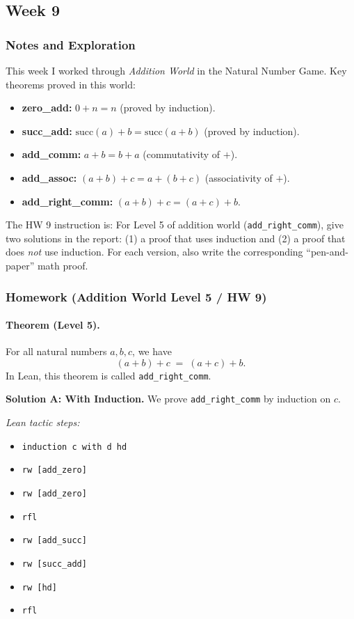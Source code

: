 \documentclass[11pt]{article}
\begin{document}
\subsection{Week 9}

\subsubsection{Notes and Exploration}
This week I worked through \emph{Addition World} in the Natural Number Game.  
Key theorems proved in this world:
\begin{itemize}[leftmargin=1.4em]
  \item \textbf{zero\_add:} $0 + n = n$ (proved by induction).
  \item \textbf{succ\_add:} $\mathrm{succ}(a) + b = \mathrm{succ}(a + b)$ (proved by induction).
  \item \textbf{add\_comm:} $a + b = b + a$ (commutativity of $+$).
  \item \textbf{add\_assoc:} $(a + b) + c = a + (b + c)$ (associativity of $+$).
  \item \textbf{add\_right\_comm:} $(a + b) + c = (a + c) + b$.
\end{itemize}

The HW 9 instruction is:  
For Level 5 of addition world (\texttt{add\_right\_comm}), give two solutions in the report:
(1) a proof that uses induction and  
(2) a proof that does \emph{not} use induction.  
For each version, also write the corresponding ``pen-and-paper'' math proof.

\subsubsection{Homework (Addition World Level 5 / HW 9)}

\paragraph{Theorem (Level 5).}
For all natural numbers $a,b,c$, we have
\[
(a + b) + c \;=\; (a + c) + b.
\]
In Lean, this theorem is called \texttt{add\_right\_comm}.

\bigskip
\noindent\textbf{Solution A: With Induction.}  
We prove \texttt{add\_right\_comm} by induction on $c$.

\emph{Lean tactic steps:}
\begin{itemize}[leftmargin=1.4em]
  \item \texttt{induction c with d hd}
  \item \texttt{rw [add\_zero]}
  \item \texttt{rw [add\_zero]}
  \item \texttt{rfl}
  \item \texttt{rw [add\_succ]}
  \item \texttt{rw [succ\_add]}
  \item \texttt{rw [hd]}
  \item \texttt{rfl}
\end{itemize}
\end{document}
